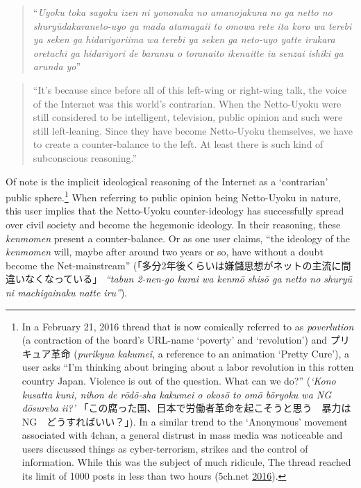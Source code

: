 \documentclass[10pt,british,A4paper,twoside]{memoir}
\begin{document}
\begin{quote}
``\emph{Uyoku toka sayoku izen ni yononaka no amanojakuna no ga netto no
shuryūdakara\newline neto-uyo ga mada atamagaii to omowa rete ita koro
wa terebi ya seken ga hidariyori\newline ima wa terebi ya seken ga
neto-uyo yatte irukara oretachi ga hidariyori de baransu o toranaito
ikenai\newline tte iu senzai ishiki ga arunda yo}''
\end{quote}

\begin{quote}
``It's because since before all of this left-wing or right-wing talk,
the voice of the Internet was this world's contrarian. When the
Netto-Uyoku were still considered to be intelligent, television, public
opinion and such were still left-leaning. Since they have become
Netto-Uyoku themselves, we have to create a counter-balance to the left.
At least there is such kind of subconscious reasoning.''
\end{quote}

Of note is the implicit ideological reasoning of the Internet as a
`contrarian' public sphere.\footnote{In a February 21, 2016 thread
  that is now comically referred to as \emph{poverlution} (a contraction
  of the board's URL-name `poverty' and `revolution') and プリキュア革命
  (\emph{purikyua kakumei}, a reference to an animation `Pretty Cure'),
  a user asks ``I'm thinking about bringing about a labor revolution in
  this rotten country Japan. Violence is out of the question. What can
  we do?'' (\emph{`Kono kusatta kuni, nihon de rōdō-sha kakumei o okosō
  to omō bōryoku wa NG dōsureba ii?'}
  「この腐った国、日本で労働者革命を起こそうと思う　暴力はNG　どうすればいい？」).
  In a similar trend to the `Anonymous' movement associated with 4chan,
  a general distrust in mass media was noticeable and users discussed
  things as cyber-terrorism, strikes and the control of information.
  While this was the subject of much ridicule, The thread reached its
  limit of 1000 posts in less than two hours (5ch.net
  \protect\hyperlink{ref-5ch.net_eng._2016}{2016}).} When
referring to public opinion being Netto-Uyoku in nature, this user implies that
the Netto-Uyoku counter-ideology has successfully spread over civil
society and become the hegemonic ideology. In their reasoning, these
\emph{kenmomen} present a counter-balance. Or as one user claims, ``the ideology
of the \emph{kenmomen} will, maybe after around two years or so, have
without a doubt become the Net-mainstream''
(「多分2年後くらいは嫌儲思想がネットの主流に間違いなくなっている」
\emph{``tabun 2-nen-go kurai wa kenmō shisō ga netto no shuryū ni
machigainaku natte iru''}).
\end{document}
